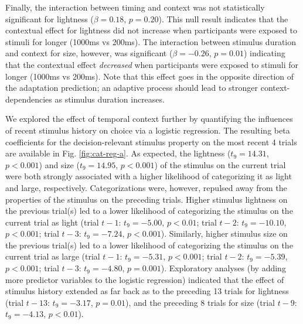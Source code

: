 \documentclass[a4paper, nobind]{templates/ociamthesis}
\begin{document}
Finally, the interaction between timing and context was not statistically significant for lightness (\(\beta=0.18\), \(p=0.20\)). This null result indicates that the contextual effect for lightness did not increase when participants were exposed to stimuli for longer (1000ms vs 200ms). The interaction between stimulus duration and context for size, however, was significant (\(\beta=-0.26\), \(p=0.01\)) indicating that the contextual effect \emph{decreased} when participants were exposed to stimuli for longer (1000ms vs 200ms). Note that this effect goes in the opposite direction of the adaptation prediction; an adaptive process should lead to stronger context-dependencies as stimulus duration increases.

We explored the effect of temporal context further by quantifying the influences of recent stimulus history on choice via a logistic regression. The resulting beta coefficients for the decision-relevant stimulus property on the most recent 4 trials are available in Fig. \ref{fig:cat-reg-a}. As expected, the lightness (\(t_9=14.31\), \(p<0.001\)) and size (\(t_9=14.95\), \(p<0.001\)) of the stimulus on the current trial were both strongly associated with a higher likelihood of categorizing it as light and large, respectively. Categorizations were, however, repulsed away from the properties of the stimulus on the preceding trials. Higher stimulus lightness on the previous trial(s) led to a lower likelihood of categorizing the stimulus on the current trial as light (trial \(t-1\): \(t_9=-5.00\), \(p<0.01\); trial \(t-2\): \(t_9=-10.10\), \(p<0.001\); trial \(t-3\): \(t_9=-7.24\), \(p<0.001\)). Similarly, higher stimulus size on the previous trial(s) led to a lower likelihood of categorizing the stimulus on the current trial as large (trial \(t-1\): \(t_9=-5.31\), \(p<0.001\); trial \(t-2\): \(t_9=-5.39\), \(p<0.001\); trial \(t-3\): \(t_9=-4.80\), \(p=0.001\)). Exploratory analyses (by adding more predictor variables to the logistic regression) indicated that the effect of stimulus history extended as far back as to the preceding 13 trials for lightness (trial \(t-13\): \(t_9=-3.17\), \(p=0.01\)), and the preceding 8 trials for size (trial \(t-9\): \(t_9=-4.13\), \(p<0.01\)).
\end{document}
